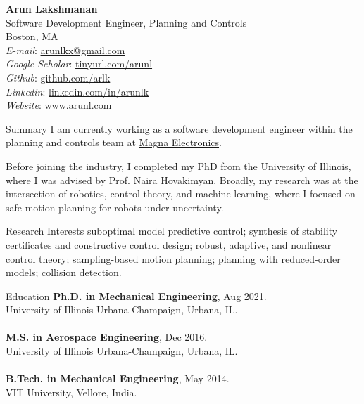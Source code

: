 \documentclass[9pt]{article}
\begin{document}
\begin{rsection}{}
\textbf{\large Arun Lakshmanan} \\
Software Development Engineer, Planning and Controls \\
Boston, MA 
\vspace{0.5em} \\
\textit{E-mail}: \href{mailto:arunlkx@gmail.com}{arunlkx@gmail.com} \\
\textit{Google Scholar}: \href{https://tinyurl.com/arunl}{tinyurl.com/arunl} \\
\textit{Github}: \href{https://github.com/arlk}{github.com/arlk} \\
\textit{Linkedin}: \href{https://www.linkedin.com/in/arunlk/}{linkedin.com/in/arunlk} \\
\textit{Website}: \href{https://www.arunl.com}{www.arunl.com} 
\end{rsection}

\begin{rsection}{Summary}
I am currently working as a software development engineer within the planning and controls team at \href{https://www.magna.com/company/company-information/magna-groups/magna-electronics}{Magna Electronics}. 

Before joining the industry, I completed my PhD from the University of Illinois, where I was advised by \href{https://naira-hovakimyan.mechse.illinois.edu/}{Prof. Naira Hovakimyan}. Broadly, my research was at the intersection of robotics, control theory, and machine learning, where I focused on safe motion planning for robots under uncertainty. 
\end{rsection}

\begin{rsection}{Research Interests}
suboptimal model predictive control; synthesis of stability certificates and constructive control design; robust, adaptive, and nonlinear control theory; sampling-based motion planning; planning with reduced-order models; collision detection.
\end{rsection}

\begin{rsection}{Education}
    \textbf{Ph.D. in Mechanical Engineering}, Aug 2021. \\
    University of Illinois Urbana-Champaign, Urbana, IL. \\ \\
    \textbf{M.S. in Aerospace Engineering}, Dec 2016. \\
    University of Illinois Urbana-Champaign, Urbana, IL. \\ \\
    \textbf{B.Tech. in Mechanical Engineering}, May 2014. \\
    VIT University, Vellore, India.
\end{rsection}
\end{document}
